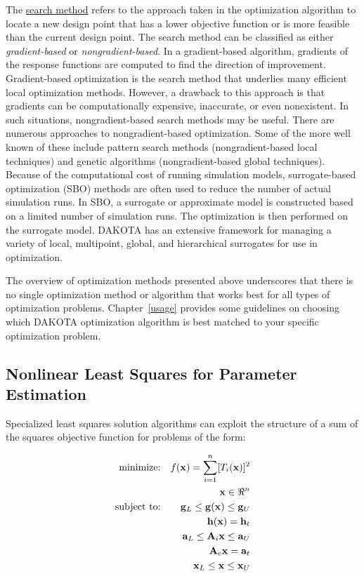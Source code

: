 The \underline{search method} refers to the approach taken in the
optimization algorithm to locate a new design point that has a lower
objective function or is more feasible than the current design point.
The search method can be classified as either \emph{gradient-based} or
\emph{nongradient-based}. In a gradient-based algorithm, gradients of
the response functions are computed to find the direction of
improvement.  Gradient-based optimization is the search method that
underlies many efficient local optimization methods. However, a
drawback to this approach is that gradients can be computationally
expensive, inaccurate, or even nonexistent. In such situations,
nongradient-based search methods may be useful. There are numerous
approaches to nongradient-based optimization. Some of the more well
known of these include pattern search methods (nongradient-based local
techniques) and genetic algorithms (nongradient-based global
techniques).  Because of the computational cost of running simulation
models, surrogate-based optimization (SBO) methods are often used to
reduce the number of actual simulation runs. In SBO, a surrogate or
approximate model is constructed based on a limited number of
simulation runs.  The optimization is then performed on the surrogate
model.  DAKOTA has an extensive framework for managing a variety of
local, multipoint, global, and hierarchical surrogates for use in
optimization.

The overview of optimization methods presented above underscores that
there is no single optimization method or algorithm that works best
for all types of optimization problems. Chapter~\ref{usage} provides
some guidelines on choosing which DAKOTA optimization algorithm is
best matched to your specific optimization problem.

\subsection{Nonlinear Least Squares for Parameter Estimation}\label{introduction:background:nonlinear}

Specialized least squares solution algorithms can exploit the
structure of a sum of the squares objective function for problems of
the form:

\begin{eqnarray}
  \hbox{minimize:} & & f(\mathbf{x}) =
  \sum_{i=1}^{n}[T_i(\mathbf{x})]^2\nonumber\\
  & & \mathbf{x} \in \Re^{n}\nonumber\\
  \hbox{subject to:} & &
  \mathbf{g}_L \leq \mathbf{g(x)} \leq \mathbf{g}_U\nonumber\\
  & & \mathbf{h(x)}=\mathbf{h}_{t}\label{introduction:equation02}\\
  & & \mathbf{a}_L \leq \mathbf{A}_i\mathbf{x} \leq
  \mathbf{a}_U\nonumber\\
  & & \mathbf{A}_e\mathbf{x}=\mathbf{a}_{t}\nonumber\\
  & & \mathbf{x}_L \leq \mathbf{x} \leq \mathbf{x}_U\nonumber
\end{eqnarray}

